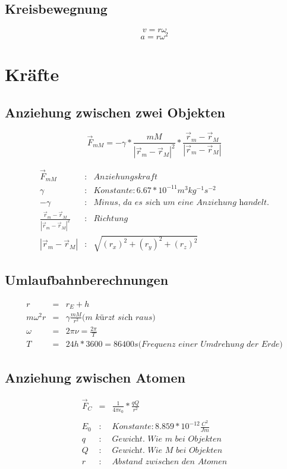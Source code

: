 \documentclass[11pt]{article}
\begin{document}
\subsection{Kreisbewegnung}
$$v = r\omega$$
$$a = r\omega^2$$
\section{Kräfte}
\subsection{Anziehung zwischen zwei Objekten}
$$\overrightarrow{F}_{mM} = -\gamma * \frac{mM}{|\overrightarrow{r}_m-\overrightarrow{r}_M|^2} * \frac{\overrightarrow{r}_m-\overrightarrow{r}_M}{|\overrightarrow{r}_m-\overrightarrow{r}_M|} $$

\begin{eqnarray*}
\overrightarrow{F}_{mM} &:& Anziehungskraft\\
\gamma &:& Konstante:6.67*10^{-11} m^3kg^{-1}s^{-2}\\
-\gamma &:& \textit{Minus, da es sich um eine Anziehung handelt.}\\
\frac{\overrightarrow{r}_m-\overrightarrow{r}_M}{|\overrightarrow{r}_m-\overrightarrow{r}_M|^2}&:&Richtung\\
|\overrightarrow{r}_m-\overrightarrow{r}_M| &:& \sqrt{(r_x)^2 + (r_y)^2 + (r_z)^2}
\end{eqnarray*}
\subsection{Umlaufbahnberechnungen}
\begin{eqnarray*}
r &=& r_E + h\\
m\omega^2r &=& \gamma\frac{mM}{r^2} \textit{(m kürzt sich raus)}\\
\omega &=& 2\pi\nu = \frac{2\pi}{T}\\
T &=& 24h * 3600 = 86400s \textit{(Frequenz einer Umdrehung der Erde)}
\end{eqnarray*}
\subsection{Anziehung zwischen Atomen}
\begin{eqnarray*}
\overrightarrow{F}_C&=&\frac{1}{4\pi\epsilon_0}*\frac{qQ}{r^2} \\
\\
E_0 &:& Konstante: 8.859*10^{-12} \frac{C^2}{Jm}\\
q &:& \textit{Gewicht. Wie m bei Objekten}\\
Q &:& \textit{Gewicht. Wie M bei Objekten}\\
r &:& \textit{Abstand zwischen den Atomen}\\
\end{eqnarray*}
\end{document}
